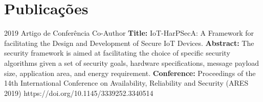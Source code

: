 \section{Publicações}

\begin{entrada}


\public
{2019}
{Artigo de Conferência}
{Co-Author}
{\textbf{Title:} IoT-HarPSecA: A Framework for facilitating the Design and Development of Secure IoT Devices.}
{\textbf{Abstract:} The security framework is aimed at facilitating the choice of specific security algorithms given a set of security goals, hardware specifications, message payload size, application area, and energy requirement.}
{\textbf{Conference:} Proceedings of the 14th International Conference on Availability, Reliability and Security (ARES 2019)}
{}{https://doi.org/10.1145/3339252.3340514}
{\vspace{-0.3cm}}
\end{entrada}





